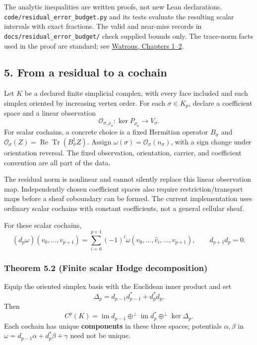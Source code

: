 \documentclass[
  11pt,
]{article}
\begin{document}
The analytic inequalities are written proofs, not new Lean declarations. \texttt{code/\allowbreak{}residual\_\allowbreak{}error\_\allowbreak{}budget.py} and its tests evaluate the resulting scalar intervals with exact fractions. The valid and near-miss records in \texttt{docs/\allowbreak{}residual\_\allowbreak{}error\_\allowbreak{}budget/\allowbreak{}} check supplied bounds only. The trace-norm facts used in the proof are standard; see \href{https://cs.uwaterloo.ca/~watrous/TQI/TQI.pdf}{Watrous, Chapters 1--2}.

\subsection{5. From a residual to a cochain}\label{from-a-residual-to-a-cochain}

Let \(K\) be a declared finite simplicial complex, with every face included
and each simplex oriented by increasing vertex order. For each
\(\sigma\in K_p\), declare a coefficient space and a linear observation
\[
\mathcal O_{\sigma,\rho_\sigma}:
\ker P_{\rho_\sigma}\longrightarrow V_\sigma.
\]
For scalar cochains, a concrete choice is a fixed Hermitian operator
\(B_\sigma\) and
\(\mathcal O_\sigma(Z)=\operatorname{Re}\operatorname{Tr}(B_\sigma^\dagger Z)\).
Assign
\(\omega(\sigma)=\mathcal O_\sigma(n_\sigma)\), with a sign change under
orientation reversal. The fixed observation, orientation, carrier, and
coefficient convention are all part of the data.

The residual norm is nonlinear and cannot silently replace this linear
observation map. Independently chosen coefficient spaces also require
restriction/transport maps before a sheaf coboundary can be formed.
The current implementation uses ordinary scalar cochains with constant
coefficients, not a general cellular sheaf.

For these scalar cochains,
\[
(d_p\omega)(v_0,\ldots,v_{p+1})
 =\sum_{i=0}^{p+1}(-1)^i
 \omega(v_0,\ldots,\widehat v_i,\ldots,v_{p+1}),\qquad
d_{p+1}d_p=0.
\]

\subsubsection{Theorem 5.2 (Finite scalar Hodge decomposition)}\label{theorem-5.2-finite-scalar-hodge-decomposition}

Equip the oriented simplex basis with the Euclidean inner product and set
\[
\Delta_p=d_{p-1}d_{p-1}^*+d_p^*d_p.
\]
Then
\[
C^p(K)=\operatorname{im}d_{p-1}
 \mathbin{\oplus^\perp}\operatorname{im}d_p^*
 \mathbin{\oplus^\perp}\ker\Delta_p.
\]
Each cochain has unique \textbf{components} in these three spaces; potentials
\(\alpha,\beta\) in
\(\omega=d_{p-1}\alpha+d_p^*\beta+\gamma\) need not be unique.
\end{document}
